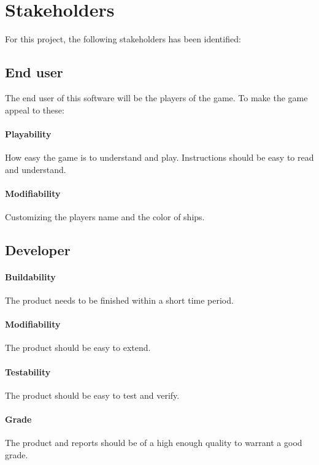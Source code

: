 \chapter{Stakeholders}
For this project, the following stakeholders has been identified:


    
    \section{End user}
    The end user of this software will be the players of the game. To make the game appeal to these:

    
        \subsubsection*{Playability}
        How easy the game is to understand and play. Instructions should be easy to read and understand.

        \subsubsection*{Modifiability}
        Customizing the players name and the color of ships.
    
    
    \section{Developer}
        \subsubsection*{Buildability}
        The product needs to be finished within a short time period.
        
        \subsubsection*{Modifiability}
        The product should be easy to extend.

        \subsubsection*{Testability}
        The product should be easy to test and verify.

        \subsubsection*{Grade}
        The product and reports should be of a high enough quality to warrant a good grade.
    
